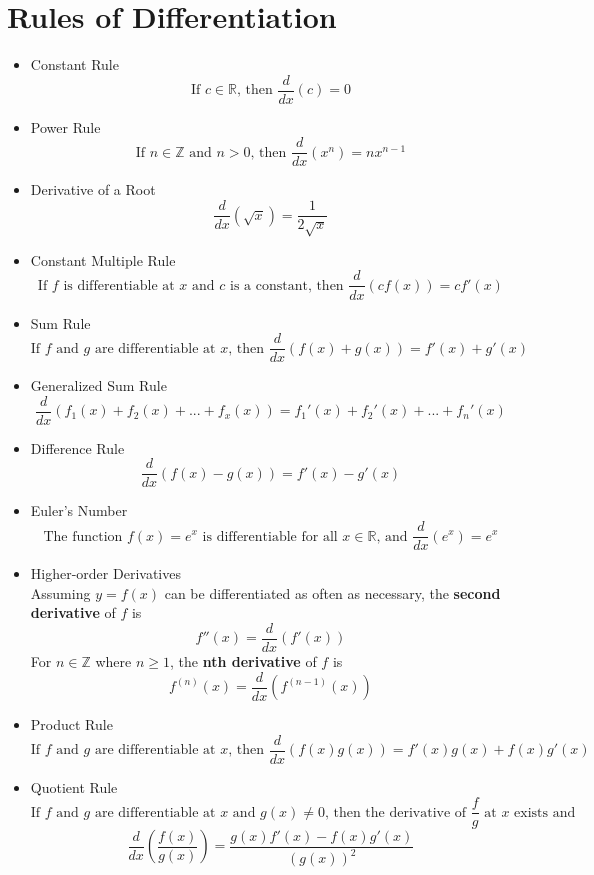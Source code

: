 \documentclass{article}
\begin{document}
\section*{Rules of Differentiation}
\begin{itemize}
    \item Constant Rule
    $$\text{If } c \in \mathbb{R} \text{, then } \frac{d}{dx}\left(c\right) = 0$$
    \item Power Rule
    $$\text{If } n \in \mathbb{Z} \text{ and } n > 0 \text{, then } \frac{d}{dx}\left(x^n\right) = nx^{n - 1}$$
    \item Derivative of a Root
    $$\frac{d}{dx}\left(\sqrt{x}\right) = \frac{1}{2\sqrt{x}}$$
    \item Constant Multiple Rule
    $$\text{If } f \text{ is differentiable at } x \text{ and } c \text{ is a constant, then } \frac{d}{dx}\left(cf(x)\right) = cf'\left(x\right)$$
    \item Sum Rule
    $$\text{If } f \text{ and } g \text{ are differentiable at } x \text{, then } \frac{d}{dx}\left(f(x) + g(x)\right) = f'(x) + g'(x)$$
    \item Generalized Sum Rule
    $$\frac{d}{dx}\left(f_1(x) + f_2(x) + ... + f_x(x)\right) = f_1'(x) + f_2'(x) + ... + f_n'(x)$$
    \item Difference Rule
    $$\frac{d}{dx}\left(f(x) - g(x)\right) = f'(x) - g'(x)$$
    \item Euler's Number
        $$\text{The function } f(x) = e^x \text{ is differentiable for all } x \in \mathbb{R} \text{, and } \frac{d}{dx}\left(e^x\right) = e^x$$
    \item Higher-order Derivatives
    \\ Assuming $y = f(x)$ can be differentiated as often as necessary, the \textbf{second derivative} of $f$ is
    $$f''(x) = \frac{d}{dx}\left(f'(x)\right)$$
    For $n \in \mathbb{Z}$ where $n \geq 1$, the \textbf{nth derivative} of $f$ is
    $$f^{(n)}\left(x\right) = \frac{d}{dx}\left(f^{(n - 1)}\left(x\right)\right)$$
    \item Product Rule
    $$\text{If } f \text{ and } g \text{ are differentiable at } x \text{, then } \frac{d}{dx}\left(f(x)g(x)\right) = f'(x)g(x) + f(x)g'(x)$$
    \item Quotient Rule
        $$\text{If } f \text{ and } g \text{ are differentiable at } x \text{ and } g(x) \neq 0 \text{, then the derivative of } \frac{f}{g} \text{ at } x \text{ exists and}$$
        $$\frac{d}{dx}\left(\frac{f(x)}{g(x)}\right) = \frac{g(x)f'(x) - f(x)g'(x)}{(g(x))^2}$$
\end{itemize}
\end{document}
